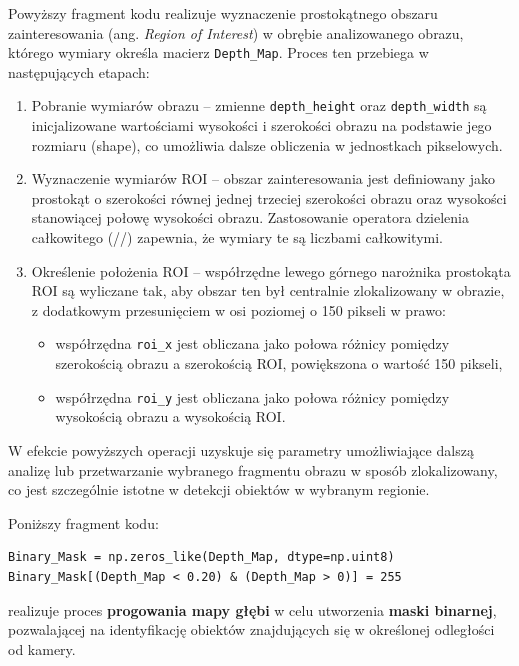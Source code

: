 \documentclass[magisterska]{pracadypl}
\begin{document}
Powyższy fragment kodu realizuje wyznaczenie prostokątnego obszaru zainteresowania (ang. \textit{Region of Interest}) w obrębie analizowanego obrazu, którego wymiary określa macierz \texttt{Depth\_Map}. Proces ten przebiega w następujących etapach:

\begin{enumerate}
  \item Pobranie wymiarów obrazu – zmienne \texttt{depth\_height} oraz \texttt{depth\_width} są inicjalizowane wartościami wysokości i szerokości obrazu na podstawie jego rozmiaru (shape), co umożliwia dalsze obliczenia w jednostkach pikselowych.
  \item Wyznaczenie wymiarów ROI – obszar zainteresowania jest definiowany jako prostokąt o szerokości równej jednej trzeciej szerokości obrazu oraz wysokości stanowiącej połowę wysokości obrazu. Zastosowanie operatora dzielenia całkowitego (//) zapewnia, że wymiary te są liczbami całkowitymi.
  \item Określenie położenia ROI – współrzędne lewego górnego narożnika prostokąta ROI są wyliczane tak, aby obszar ten był centralnie zlokalizowany w obrazie, z dodatkowym przesunięciem w osi poziomej o 150 pikseli w prawo:
  \begin{itemize}
    \item współrzędna \texttt{roi\_x} jest obliczana jako połowa różnicy pomiędzy szerokością obrazu a szerokością ROI, powiększona o wartość 150 pikseli,
    \item współrzędna \texttt{roi\_y} jest obliczana jako połowa różnicy pomiędzy wysokością obrazu a wysokością ROI.
  \end{itemize}
\end{enumerate}

W efekcie powyższych operacji uzyskuje się parametry umożliwiające dalszą analizę lub przetwarzanie wybranego fragmentu obrazu w sposób zlokalizowany, co jest szczególnie istotne w detekcji obiektów w wybranym regionie.

Poniższy fragment kodu:

\begin{lstlisting}[style=mypython]
Binary_Mask = np.zeros_like(Depth_Map, dtype=np.uint8)
Binary_Mask[(Depth_Map < 0.20) & (Depth_Map > 0)] = 255
\end{lstlisting}

realizuje proces \textbf{progowania mapy głębi} w celu utworzenia \textbf{maski binarnej}, pozwalającej na identyfikację obiektów znajdujących się w określonej odległości od kamery.
\end{document}

